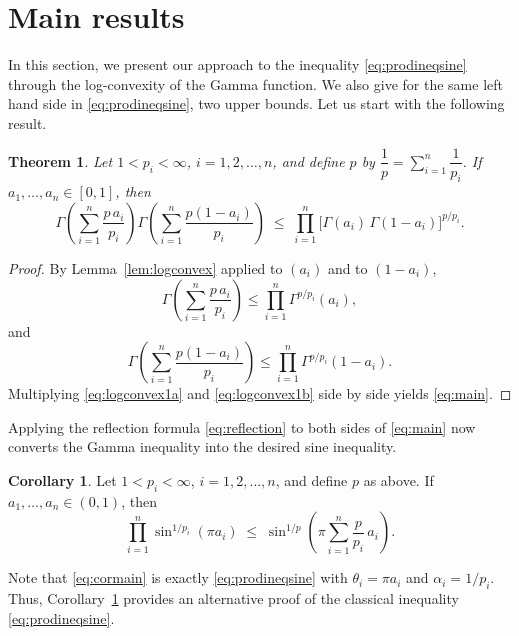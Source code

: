 \documentclass[12pt]{amsart}
\newtheorem{theorem}{Theorem}[section]
\theoremstyle{definition}
\newtheorem{corollary}{Corollary}[section]
\begin{document}
\section{Main results}\label{sec:main}
In this section, we present our approach to the inequality \eqref{eq:prodineqsine} through the log-convexity of the Gamma function. We also give for the same left hand side in \eqref{eq:prodineqsine}, two upper bounds. Let us start with the following result.
\begin{theorem}\label{thm:main}
Let $1<p_i<\infty$, $i=1,2,\ldots,n$, and define $p$ by
$\dfrac{1}{p}=\displaystyle\sum_{i=1}^{n}\dfrac{1}{p_i}$.
If $a_1,\ldots,a_n\in[0,1]$, then
\begin{equation}\label{eq:main}
  \Gamma\!\left(\sum_{i=1}^n\frac{p\,a_i}{p_i}\right)
  \Gamma\!\left(\sum_{i=1}^n\frac{p(1-a_i)}{p_i}\right)
  \;\leq\;
  \prod_{i=1}^n
  \bigl[\Gamma(a_i)\,\Gamma(1-a_i)\bigr]^{p/p_i}.
\end{equation}
\end{theorem}

\begin{proof}
By Lemma~\ref{lem:logconvex} applied to $(a_i)$ and to $(1-a_i)$,
\begin{equation}\label{eq:logconvex1a}
    \Gamma\!\left(\sum_{i=1}^n\frac{p\,a_i}{p_i}\right)
  \leq \prod_{i=1}^n\Gamma^{p/p_i}(a_i),
\end{equation}
and
\begin{equation} \label{eq:logconvex1b}
     \Gamma\!\left(\sum_{i=1}^n\frac{p(1-a_i)}{p_i}\right)
  \leq \prod_{i=1}^n\Gamma^{p/p_i}(1-a_i).
\end{equation}
Multiplying \eqref{eq:logconvex1a} and \eqref{eq:logconvex1b}
side by side yields \eqref{eq:main}.
\end{proof}

Applying the reflection formula \eqref{eq:reflection} to both
sides of \eqref{eq:main} now converts the Gamma inequality into
the desired sine inequality.

\begin{corollary}\label{cor:main}
Let $1<p_i<\infty$, $i=1,2,\ldots,n$, and define $p$ as above.
If $a_1,\ldots,a_n\in(0,1)$, then
\begin{equation}\label{eq:cormain}
  \prod_{i=1}^n\sin^{1/p_i}(\pi a_i)
  \;\leq\;
  \sin^{1/p}\!\left(\pi\sum_{i=1}^n\frac{p}{p_i}\,a_i\right).
\end{equation}
\end{corollary}

Note that \eqref{eq:cormain} is exactly \eqref{eq:prodineqsine}
with $\theta_i=\pi a_i$ and $\alpha_i=1/p_i$. Thus,
Corollary~\ref{cor:main} provides an alternative proof of the
classical inequality \eqref{eq:prodineqsine}.
\end{document}
